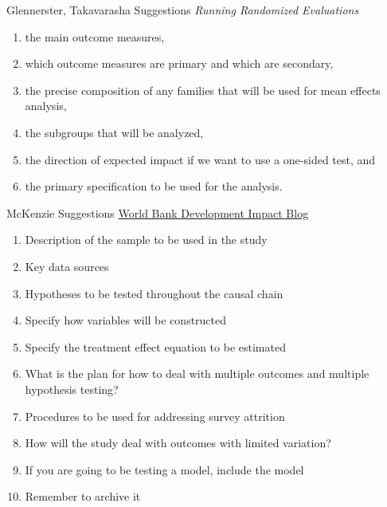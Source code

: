 \documentclass{beamer}
\begin{document}
\begin{frame}{Glennerster, Takavarasha Suggestions}
\textit{Running Randomized Evaluations}
\begin{enumerate}
\def\labelenumi{\arabic{enumi}.}
\item
  the main outcome measures,
\item
  which outcome measures are primary and which are secondary,
\item
  the precise composition of any families that will be used for mean
  effects analysis,
\item
  the subgroups that will be analyzed,
\item
  the direction of expected impact if we want to use a one-sided test,
  and
\item
  the primary specification to be used for the analysis.
\end{enumerate}
\end{frame}
\begin{frame}{McKenzie Suggestions}
\href{http://blogs.worldbank.org/impactevaluations/a-pre-analysis-plan-checklist}{World Bank Development Impact Blog}

\begin{enumerate}
\item
  Description of the sample to be used in the study
\item
  Key data sources
\item
  Hypotheses to be tested throughout the causal chain
\item
  Specify how variables will be constructed
\item
  Specify the treatment effect equation to be estimated
\item
  What is the plan for how to deal with multiple outcomes and multiple
  hypothesis testing?
\item
  Procedures to be used for addressing survey attrition
\item
  How will the study deal with outcomes with limited variation?
\item
  If you are going to be testing a model, include the model
\item
  Remember to archive it
\end{enumerate}
\end{frame}
\end{document}
